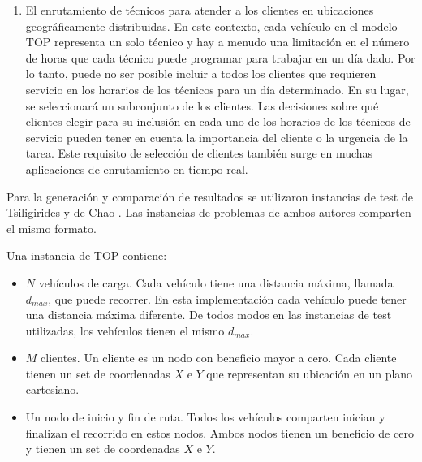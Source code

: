 \begin{enumerate}[i]
\item

El enrutamiento de técnicos para atender a los clientes en ubicaciones geográficamente distribuidas. En este contexto, cada vehículo en el modelo TOP representa un solo técnico y hay a menudo una limitación en el número de horas que cada técnico puede programar para trabajar en un día dado. Por lo tanto, puede no ser posible incluir a todos los clientes que requieren servicio en los horarios de los técnicos para un día determinado. En su lugar, se seleccionará un subconjunto de los clientes. Las decisiones sobre qué clientes elegir para su inclusión en cada uno de los horarios de los técnicos de servicio pueden tener en cuenta la importancia del cliente o la urgencia de la tarea. Este requisito de selección de clientes también surge en muchas aplicaciones de enrutamiento en tiempo real.

\end{enumerate}

Para la generación y comparación de resultados se utilizaron instancias de test de Tsiligirides y de Chao \cite{IntancesChaoTsiligirides}. Las instancias de problemas de ambos autores comparten el mismo formato. 

\bigskip

\begin{minipage}{\textwidth}
Una instancia de TOP contiene:

\begin{itemize}
  \item $N$ vehículos de carga. Cada vehículo tiene una distancia máxima, llamada $d_{max}$, que puede recorrer. En esta implementación cada vehículo puede tener una distancia máxima diferente. De todos modos en las instancias de test utilizadas, los vehículos tienen el mismo $d_{max}$.
  \item $M$ clientes. Un cliente es un nodo con beneficio mayor a cero. Cada cliente tienen un set de coordenadas $X$ e $Y$ que representan su ubicación en un plano cartesiano.
  \item Un nodo de inicio y fin de ruta. Todos los vehículos comparten inician y finalizan el recorrido en estos nodos. Ambos nodos tienen un beneficio de cero y tienen un set de coordenadas $X$ e $Y$.
\end{itemize}
\end{minipage}

\bigskip

